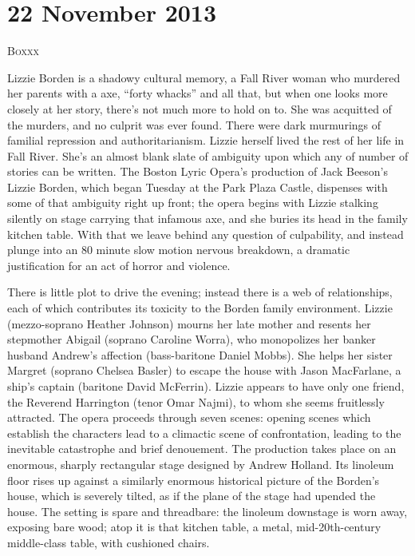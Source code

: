 \chapter{22 November 2013}

\textsc{Boxxx}

Lizzie Borden is a shadowy cultural memory, a Fall River woman who murdered her parents with a axe, “forty whacks” and all that, but when one looks more closely at her story, there’s not much more to hold on to. She was acquitted of the murders, and no culprit was ever found. There were dark murmurings of familial repression and authoritarianism. Lizzie herself lived the rest of her life in Fall River. She’s an almost blank slate of ambiguity upon which any of number of stories can be written. The Boston Lyric Opera’s production of Jack Beeson’s Lizzie Borden, which began Tuesday at the Park Plaza Castle, dispenses with some of that ambiguity right up front; the opera begins with Lizzie stalking silently on stage carrying that infamous axe, and she buries its head in the family kitchen table. With that we leave behind any question of culpability, and instead plunge into an 80 minute slow motion nervous breakdown, a dramatic justification for an act of horror and violence.

There is little plot to drive the evening; instead there is a web of relationships, each of which contributes its toxicity to the Borden family environment. Lizzie (mezzo-soprano Heather Johnson) mourns her late mother and resents her stepmother Abigail (soprano Caroline Worra), who monopolizes her banker husband Andrew’s affection (bass-baritone Daniel Mobbs). She helps her sister Margret (soprano Chelsea Basler) to escape the house with Jason MacFarlane, a ship’s captain (baritone David McFerrin). Lizzie appears to have only one friend, the Reverend Harrington (tenor Omar Najmi), to whom she seems fruitlessly attracted. The opera proceeds through seven scenes: opening scenes which establish the characters lead to a climactic scene of confrontation, leading to the inevitable catastrophe and brief denouement. The production takes place on an enormous, sharply rectangular stage designed by Andrew Holland. Its linoleum floor rises up against a similarly enormous historical picture of the Borden’s house, which is severely tilted, as if the plane of the stage had upended the house. The setting is spare and threadbare: the linoleum downstage is worn away, exposing bare wood; atop it is that kitchen table, a metal, mid-20th-century middle-class table, with cushioned chairs.

